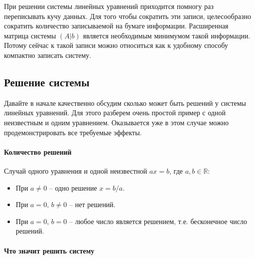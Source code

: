 При решении системы линейных уравнений приходится помногу раз переписывать кучу данных.
Для того чтобы сократить эти записи, целесообразно сократить количество записываемой на бумаге информации.
Расширенная матрица системы $(A|b)$ является необходимым минимумом такой информации.
Потому сейчас к такой записи можно относиться как к удобному способу компактно записать систему.

\subsection{Решение системы}
\label{section::Solution}

Давайте в начале качественно обсудим сколько может быть решений у системы линейных уравнений.
Для этого разберем очень простой пример с одной неизвестным и одним уравнением.
Оказывается уже в этом случае можно продемонстрировать все требуемые эффекты.

\paragraph{Количество решений}

Случай одного уравнения и одной неизвестной $ax = b$, где $a, b\in \mathbb R$:
\begin{itemize}
\item При $a\neq 0$ -- одно решение $x = b/a$.

\item При $a = 0$, $b\neq 0$ -- нет решений.

\item При $a = 0$, $b = 0$ -- любое число является решением, т.е. бесконечное число решений.
\end{itemize}

\paragraph{Что значит решить систему}

